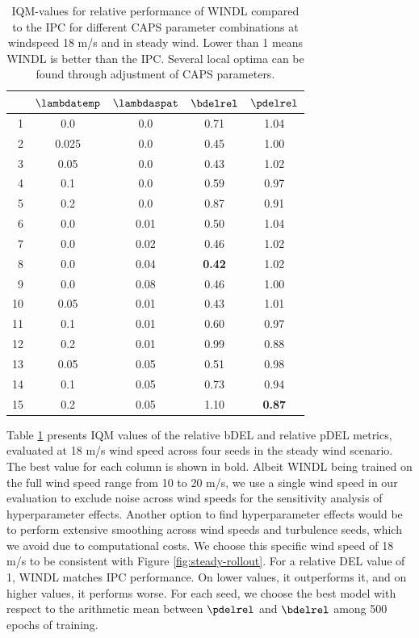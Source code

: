 \begin{table}
  \centering
  \begin{tabular}{rcc@{\hskip 1.5cm}cc}
    \toprule
    & $\lambdatemp$ & $\lambdaspat$ & $\bdelrel$ & $\pdelrel$ \\
    \midrule
    1 & 0.0 & 0.0 & 0.71 & 1.04 \\
    2 & 0.025 & 0.0 & 0.45 &  1.00 \\
    3 & 0.05 & 0.0 & 0.43 & 1.02 \\
    4 & 0.1 & 0.0 & 0.59 & 0.97 \\
    5 & 0.2 & 0.0 & 0.87 & 0.91 \\
    6 & 0.0 & 0.01 & 0.50 & 1.04 \\
    7 & 0.0 & 0.02 & 0.46 & 1.02 \\
    8 & 0.0 & 0.04 & \textbf{0.42} & 1.02 \\
    9 & 0.0 & 0.08 & 0.46 & 1.00 \\
    
    \midrule
    10 & 0.05 & 0.01 & 0.43 & 1.01 \\
    11 & 0.1 & 0.01 & 0.60 & 0.97 \\
    12 & 0.2 & 0.01 & 0.99 & 0.88 \\
    13 & 0.05 & 0.05 & 0.51 & 0.98 \\
    14 & 0.1 & 0.05 & 0.73 & 0.94 \\
    15 & 0.2 & 0.05 & 1.10 & \textbf{0.87} \\

    
    \bottomrule
  \end{tabular}
  \caption{\acs{IQM}-values for relative performance of WINDL compared to the IPC for different \ac{CAPS} parameter combinations at windspeed 18 m/s and in steady wind. Lower than 1 means WINDL is better than the IPC. Several local optima can be found through adjustment of \ac{CAPS} parameters.}
  \label{table:pb-trade-steady}
\end{table}


Table \ref{table:pb-trade-steady} presents \ac{IQM} values of the relative bDEL and relative pDEL metrics, evaluated at 18 m/s wind speed across four seeds in the steady wind scenario. The best value for each column is shown in bold. Albeit WINDL being trained on the full wind speed range from 10 to 20 m/s, we use a single wind speed in our evaluation to exclude noise across wind speeds for the sensitivity analysis of hyperparameter effects. Another option to find hyperparameter effects would be to perform extensive smoothing across wind speeds and turbulence seeds, which we avoid due to computational costs. We choose this specific wind speed of 18 m/s to be consistent with Figure \ref{fig:steady-rollout}. For a relative DEL value of 1, WINDL matches IPC performance. On lower values, it outperforms it, and on higher values, it performs worse. For each seed, we choose the best model with respect to the arithmetic mean between $\pdelrel$ and $\bdelrel$ among 500 epochs of training.

